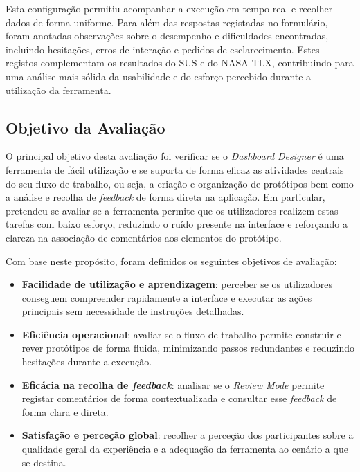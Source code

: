 Esta configuração permitiu acompanhar a execução em tempo real e recolher dados de forma uniforme. Para além das respostas registadas no formulário, foram anotadas observações sobre o desempenho e dificuldades encontradas, incluindo hesitações, erros de interação e pedidos de esclarecimento. Estes registos complementam os resultados do SUS e do NASA-TLX, contribuindo para uma análise mais sólida da usabilidade e do esforço percebido durante a utilização da ferramenta.

\subsection{Objetivo da Avaliação}
\label{subsec:cap5_objectivo}

O principal objetivo desta avaliação foi verificar se o \textit{Dashboard Designer} é uma ferramenta de fácil utilização e se suporta de forma eficaz as atividades centrais do seu fluxo de trabalho, ou seja, a criação e organização de protótipos bem como a análise e recolha de \textit{feedback} de forma direta na aplicação. Em particular, pretendeu-se avaliar se a ferramenta permite que os utilizadores realizem estas tarefas com baixo esforço, reduzindo o ruído presente na interface e reforçando a clareza na associação de comentários aos elementos do protótipo.

Com base neste propósito, foram definidos os seguintes objetivos de avaliação:

\begin{itemize}
    \item \textbf{Facilidade de utilização e aprendizagem}: perceber se os utilizadores conseguem compreender rapidamente a interface e executar as ações principais sem necessidade de instruções detalhadas.
    \item \textbf{Eficiência operacional}: avaliar se o fluxo de trabalho permite construir e rever protótipos de forma fluida, minimizando passos redundantes e reduzindo hesitações durante a execução.
    \item \textbf{Eficácia na recolha de \textit{feedback}}: analisar se o \textit{Review Mode} permite registar comentários de forma contextualizada e consultar esse \textit{feedback} de forma clara e direta.
    \item \textbf{Satisfação e perceção global}: recolher a perceção dos participantes sobre a qualidade geral da experiência e a adequação da ferramenta ao cenário a que se destina.
\end{itemize}

